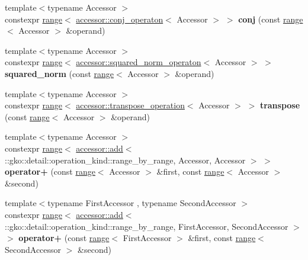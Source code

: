 \begin{DoxyCompactItemize}
\item 
\mbox{\label{namespacegko_a5d217879d3f2759a2020e2ff5bbb2eca}} 
{\footnotesize template$<$typename Accessor $>$ }\\constexpr \hyperlink{classgko_1_1range}{range}$<$ \hyperlink{structgko_1_1accessor_1_1conj__operaton}{accessor\+::conj\+\_\+operaton}$<$ Accessor $>$ $>$ {\bfseries conj} (const \hyperlink{classgko_1_1range}{range}$<$ Accessor $>$ \&operand)
\item 
\mbox{\label{namespacegko_aaf85875a944e6e03c8427d3790e568c1}} 
{\footnotesize template$<$typename Accessor $>$ }\\constexpr \hyperlink{classgko_1_1range}{range}$<$ \hyperlink{structgko_1_1accessor_1_1squared__norm__operaton}{accessor\+::squared\+\_\+norm\+\_\+operaton}$<$ Accessor $>$ $>$ {\bfseries squared\+\_\+norm} (const \hyperlink{classgko_1_1range}{range}$<$ Accessor $>$ \&operand)
\item 
\mbox{\label{namespacegko_af0d61bb1d045d3cc21add96cd565cb56}} 
{\footnotesize template$<$typename Accessor $>$ }\\constexpr \hyperlink{classgko_1_1range}{range}$<$ \hyperlink{structgko_1_1accessor_1_1transpose__operation}{accessor\+::transpose\+\_\+operation}$<$ Accessor $>$ $>$ {\bfseries transpose} (const \hyperlink{classgko_1_1range}{range}$<$ Accessor $>$ \&operand)
\item 
\mbox{\label{namespacegko_a1313bcbb37e83bf24a111edfebb83e44}} 
{\footnotesize template$<$typename Accessor $>$ }\\constexpr \hyperlink{classgko_1_1range}{range}$<$ \hyperlink{structgko_1_1accessor_1_1add}{accessor\+::add}$<$ \+::gko\+::detail\+::operation\+\_\+kind\+::range\+\_\+by\+\_\+range, Accessor, Accessor $>$ $>$ {\bfseries operator+} (const \hyperlink{classgko_1_1range}{range}$<$ Accessor $>$ \&first, const \hyperlink{classgko_1_1range}{range}$<$ Accessor $>$ \&second)
\item 
\mbox{\label{namespacegko_a0d04205743fc18e740caee6b8cb8720c}} 
{\footnotesize template$<$typename First\+Accessor , typename Second\+Accessor $>$ }\\constexpr \hyperlink{classgko_1_1range}{range}$<$ \hyperlink{structgko_1_1accessor_1_1add}{accessor\+::add}$<$ \+::gko\+::detail\+::operation\+\_\+kind\+::range\+\_\+by\+\_\+range, First\+Accessor, Second\+Accessor $>$ $>$ {\bfseries operator+} (const \hyperlink{classgko_1_1range}{range}$<$ First\+Accessor $>$ \&first, const \hyperlink{classgko_1_1range}{range}$<$ Second\+Accessor $>$ \&second)

\end{DoxyCompactItemize}
